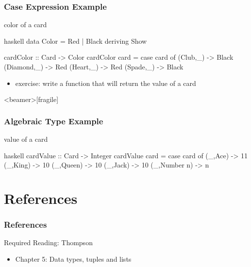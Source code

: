 \documentclass[dvipsnames]{beamer}
\theoremstyle{plain}
\begin{document}
\begin{frame}[fragile]
  \frametitle{Case Expression Example}

  \begin{exampleblock}{color of a card}
    \begin{pygments}{haskell}
data Color = Red | Black
             deriving Show

cardColor :: Card -> Color
cardColor card =
    case card of
      (Club,_) -> Black
      (Diamond,_) -> Red
      (Heart,_) -> Red
      (Spade,_) -> Black
    \end{pygments}
  \end{exampleblock}

  \pause
  \begin{itemize}
    \item exercise: write a function that will return the value of a card
  \end{itemize}
\end{frame}

\begin{frame}<beamer>[fragile]
  \frametitle{Algebraic Type Example}

  \begin{exampleblock}{value of a card}
    \begin{pygments}{haskell}
cardValue :: Card -> Integer
cardValue card =
    case card of
      (_,Ace) -> 11
      (_,King) -> 10
      (_,Queen) -> 10
      (_,Jack) -> 10
      (_,Number n) -> n
    \end{pygments}
  \end{exampleblock}
\end{frame}

\section*{References}

\begin{frame}
  \frametitle{References}

  \begin{block}{Required Reading: Thompson}
    \begin{itemize}
      \item Chapter 5: \alert{Data types, tuples and lists}
    \end{itemize}
  \end{block}
\end{frame}
\end{document}
